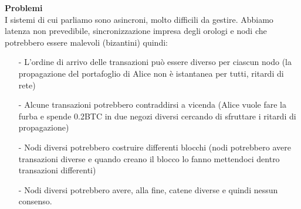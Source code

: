 \documentclass[12pt,italian]{report}
\begin{document}
\bigbreak
\noindent \textbf{Problemi} \\
I sistemi di cui parliamo sono asincroni, molto difficili da gestire. Abbiamo latenza non prevedibile, sincronizzazione impresa degli orologi e nodi che potrebbero essere malevoli (bizantini) quindi:
\begin{itemize}
    \item [-] L'ordine di arrivo delle transazioni può essere diverso per ciascun nodo (la propagazione del portafoglio di Alice non è istantanea per tutti, ritardi di rete)
    \item [-] Alcune transazioni potrebbero contraddirsi a vicenda (Alice vuole fare la furba e spende 0.2BTC in due negozi diversi cercando di sfruttare i ritardi di propagazione)
    \item [-] Nodi diversi potrebbero costruire differenti blocchi (nodi potrebbero avere transazioni diverse e quando creano il blocco lo fanno mettendoci dentro transazioni differenti)
    \item[-] Nodi diversi potrebbero avere, alla fine, catene diverse e quindi nessun consenso. 
\end{itemize}
\end{document}
